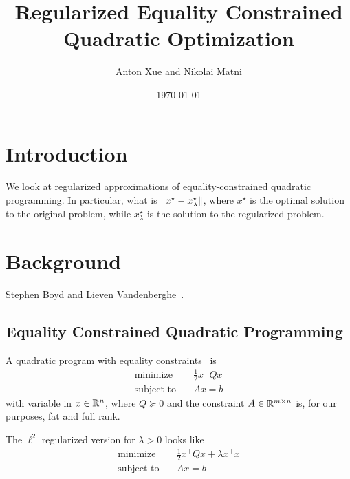 \documentclass[12pt]{article}
\title{Regularized Equality Constrained Quadratic Optimization}
\author{Anton Xue and Nikolai Matni}
\date{\today}
\date{}
\begin{document}
\maketitle

\section{Introduction}
We look at regularized approximations
of equality-constrained quadratic programming.
In particular, what is \({\left\lVert x^\star - x_{\lambda} ^\star\right\rVert}\),
where \(x^\star\) is the optimal solution to the original problem,
while \(x_{\lambda} ^\star\) is the solution to the regularized problem.


\section{Background}
Stephen Boyd and Lieven Vandenberghe~\cite{boyd2004convex}.

\subsection{Equality Constrained Quadratic Programming}

A quadratic program with equality constraints~\cite{boyd2004convex} is
\begin{align}
  \text{minimize} &\quad \frac{1}{2} x^\top Q x
    \label{eqn:qp} \\
  \text{subject to} &\quad Ax = b
\end{align}
with variable in \(x \in {\mathbb{R}}^n\),
where \(Q \succeq 0\) and the constraint \(A \in {\mathbb{R}}^{m \times n}\) is,
for our purposes, fat and full rank.

The \(\ell^2\) regularized version for \(\lambda > 0\) looks like
\begin{align}
  \text{minimize} &\quad \frac{1}{2} x^\top Q x + \lambda x^\top x
    \label{eqn:reg-qp} \\
  \text{subject to} &\quad Ax = b
\end{align}
\end{document}
